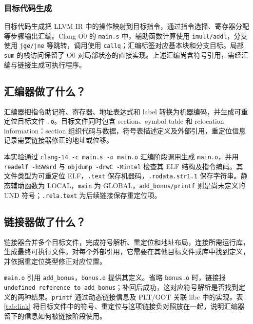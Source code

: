 \subsubsection{目标代码生成}
\label{sec:toolchain-code-generation}
目标代码生成把 LLVM IR 中的操作映射到目标指令，通过指令选择、寄存器分配等步骤输出汇编。Clang O0 的 \texttt{main.s} 中，辅助函数计算使用 \texttt{imull/addl}，分支使用 \texttt{jge/jne} 等跳转，调用使用 \texttt{callq}；汇编标签对应基本块和分支目标。局部 \texttt{sum} 的栈访问保留了 O0 对局部状态的直接实现。上述汇编尚含符号引用，需经汇编与链接生成可执行程序。

\subsection{汇编器做了什么？}
\label{sec:toolchain-assembler}
汇编器把指令助记符、寄存器、地址表达式和 label 转换为机器编码，并生成可重定位目标文件 \texttt{.o}。目标文件同时包含 section、symbol table 和 relocation information：section 组织代码与数据，符号表描述定义及外部引用，重定位信息记录需要链接器修正的地址或位移。

本实验通过 \texttt{clang-14 -c main.s -o main.o} 汇编阶段调用生成 \texttt{main.o}，并用 \texttt{readelf -hSWsrd} 与 \texttt{objdump -drwC -Mintel} 检查其 ELF 结构及指令编码。其文件类型为可重定位 ELF，\texttt{.text} 保存机器码，\texttt{.rodata.str1.1} 保存字符串。静态辅助函数为 LOCAL，\texttt{main} 为 GLOBAL，\texttt{add\_bonus/printf} 则是尚未定义的 UND 符号；\texttt{.rela.text} 为后续链接保存重定位项。

\subsection{链接器做了什么？}
\label{sec:toolchain-linker}
链接器合并多个目标文件，完成符号解析、重定位和地址布局，连接所需运行库，生成最终可执行文件。对每个外部引用，它需要在其他目标文件或库中找到定义，并依据重定位类型修正对应位置。

\texttt{main.o} 引用 \texttt{add\_bonus}，\texttt{bonus.o} 提供其定义。省略 \texttt{bonus.o} 时，链接报 \texttt{undefined reference to add\_bonus}；补回后成功，这对应符号解析是否找到定义的两种结果。\texttt{printf} 通过动态链接信息及 PLT/GOT 关联 libc 中的实现。表\ref{tab:link} 将目标文件中的符号、重定位与这项链接负对照放在一起，说明汇编器留下的信息如何被链接阶段使用。

